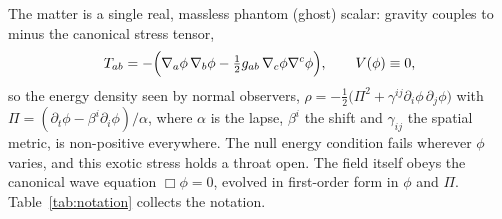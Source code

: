 \documentclass[twocolumn,floatfix,aps,prd,superscriptaddress,nofootinbib]{revtex4-2}
\begin{document}
The matter is a single real, massless phantom (ghost) scalar: gravity couples to minus the canonical stress tensor,
\begin{equation}
T_{ab} = -\Bigl(\nabla_a\phi\,\nabla_b\phi - \tfrac12 g_{ab}\,\nabla_c\phi\nabla^c\phi\Bigr),
\qquad V(\phi)\equiv 0,
\label{eq:phantom}
\end{equation}
so the energy density seen by normal observers, $\rho=-\tfrac12\bigl(\Pi^2+\gamma^{ij}\partial_i\phi\,\partial_j\phi\bigr)$ with $\Pi=(\partial_t\phi-\beta^i\partial_i\phi)/\alpha$, where $\alpha$ is the lapse, $\beta^i$ the shift and $\gamma_{ij}$ the spatial metric, is non-positive everywhere. The null energy condition fails wherever $\phi$ varies, and this exotic stress holds a throat open. The field itself obeys the canonical wave equation $\Box\phi=0$, evolved in first-order form in $\phi$ and $\Pi$. Table~\ref{tab:notation} collects the notation.
\end{document}
